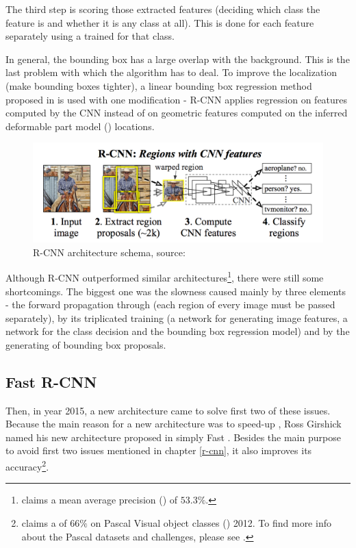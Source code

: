 The third step is scoring those extracted features (deciding which class the feature is and whether it is any class at all). This is done for each feature separately using a  trained for that class.

In general, the bounding box has a large overlap with the background. This is the last problem with which the algorithm has to deal. To improve the localization (make bounding boxes tighter), a linear bounding box regression method proposed in \cite{object-det} is used with one modification - R-CNN applies regression on features computed by the CNN instead of on geometric features computed on the inferred deformable part model () locations.

\begin{figure}[H]
   \centering
	\includegraphics[width=.9\linewidth]{./pictures/rcnn.png}
	\caption[R-CNN architecture]{R-CNN architecture schema, source: \cite{rcnn}}
      \label{fig:rcnn}
\end{figure}

Although R-CNN outperformed similar architectures\footnote{\cite{rcnn} claims a mean average precision () of $53.3 \%$.}, there were still some shortcomings. The biggest one was the slowness caused mainly by three elements - the forward propagation through  (each region of every image must be passed separately), by its triplicated training (a network for generating image features, a network for the class decision and the bounding box regression model) and by the generating of bounding box proposals.

\subsection{Fast R-CNN}
\label{fast-rcnn}

Then, in year 2015, a new architecture came to solve first two of these issues. Because the main reason for a new architecture was to speed-up , Ross Girshick named his new architecture proposed in \cite{fast-rcnn} simply Fast . Besides the main purpose to avoid first two issues mentioned in chapter \ref{r-cnn}, it also improves its accuracy\footnote{\cite{fast-rcnn} claims a  of $66 \%$ on Pascal Visual object classes () 2012. To find more info about the Pascal  datasets and challenges, please see \cite{voc}.}.

